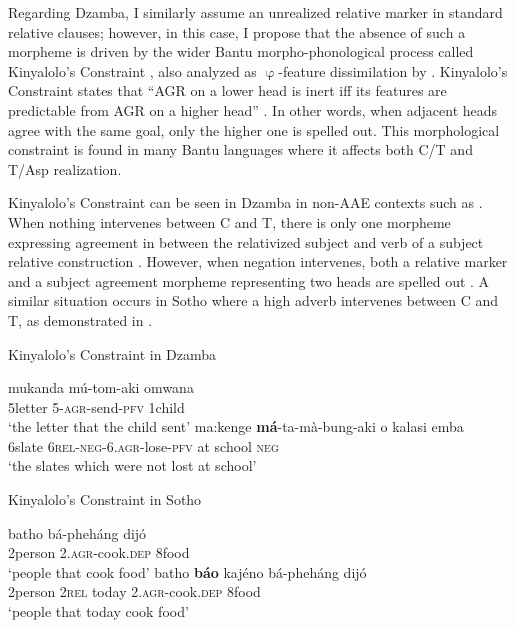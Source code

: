 \documentclass[output=paper,colorlinks,citecolor=brown
]{langscibook}
\begin{document}
Regarding Dzamba, I similarly assume an unrealized relative marker in standard relative clauses; however, in this case, I propose that the absence of such a morpheme is driven by the wider Bantu morpho-phonological process called Kinyalolo's Constraint \citep{Kinyalolo:1991,Carstens:2005}, also analyzed as $\upvarphi$-feature dissimilation by \citet{Oxford:2018}. Kinyalolo's Constraint states that ``AGR on a lower head is inert iff its features are predictable from AGR on a higher head'' \citep[253]{Carstens:2005}. In other words, when adjacent heads agree with the same goal, only the higher one is spelled out. This morphological constraint is found in many Bantu languages where it affects both C/T and T/Asp realization.

Kinyalolo's Constraint can be seen in Dzamba in non-AAE contexts such as . When nothing intervenes between C and T, there is only one morpheme expressing agreement in between the relativized subject and verb of a subject relative construction . However, when negation intervenes, both a relative marker and a subject agreement morpheme \textendash{} representing two heads \textendash{} are spelled out . A similar situation occurs in Sotho where a high adverb intervenes between C and T, as demonstrated in .

\ea Kinyalolo's Constraint in Dzamba \citep{Bokamba:1976} \label{ex:myers:dz!}
\begin{xlist}
\ex \gll mukanda mú-tom-aki omwana\\
5letter 5-\textsc{agr}-send-\textsc{pfv} 1child\\
\glt `the letter that the child sent' \label{ex:myers:dzamba1}
\ex \gll ma:kenge {\bfseries  má}-ta-mà-bung-aki o kalasi emba\\
6slate 6\textsc{rel-neg-6.agr}-lose-\textsc{pfv} at school \textsc{neg}\\
\glt `the slates which were not lost at school' \label{ex:myers:dzamba2}
\end{xlist}
\z

\ea Kinyalolo's Constraint in Sotho \citep{Demuth:1995} \label{ex:myers:sotho!}
\begin{xlist}
\ex \gll batho bá-pheháng dijó\\
2person 2\textsc{.agr}-cook.\textsc{dep} 8food\\
\glt `people that cook food' \label{ex:myers:sotho1}
\ex \gll batho {\bfseries  báo} kajéno bá-pheháng dijó\\
2person 2\textsc{rel} today 2\textsc{.agr}-cook.\textsc{dep} 8food\\
\glt `people that today cook food' \label{ex:myers:sotho2}
\end{xlist}
\z
\end{document}
